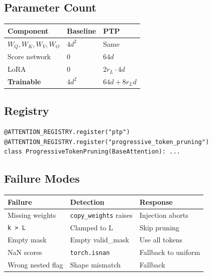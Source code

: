 {\subsection{Parameter Count}

\begin{table}[H]
\centering
\small
\begin{tabular}{lll}
\toprule
\textbf{Component} & \textbf{Baseline} & \textbf{PTP} \\
\midrule
$W_Q, W_K, W_V, W_O$ & $4 d^2$ & Same \\
Score network & 0 & $64 d$ \\
LoRA & 0 & $2 r_L \cdot 4 d$ \\
\textbf{Trainable} & $4 d^2$ & \textbf{$64 d + 8 r_L d$} \\
\bottomrule
\end{tabular}
\end{table}

\subsection{Registry}

\begin{lstlisting}
@ATTENTION_REGISTRY.register("ptp")
@ATTENTION_REGISTRY.register("progressive_token_pruning")
class ProgressiveTokenPruning(BaseAttention): ...
\end{lstlisting}

\subsection{Failure Modes}

\begin{table}[H]
\centering
\small
\begin{tabular}{lll}
\toprule
\textbf{Failure} & \textbf{Detection} & \textbf{Response} \\
\midrule
Missing weights & \texttt{copy\_weights} raises & Injection aborts \\
\texttt{k > L} & Clamped to L & Skip pruning \\
Empty mask & Empty valid\_mask & Use all tokens \\
NaN scores & \texttt{torch.isnan} & Fallback to uniform \\
Wrong nested flag & Shape mismatch & Fallback \\
\bottomrule
\end{tabular}
\end{table}




}
